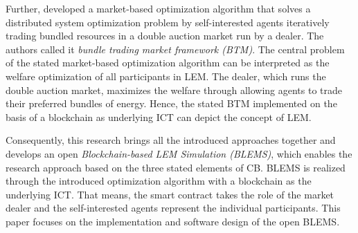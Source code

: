 Further,  developed a market-based optimization algorithm
that solves a distributed system optimization problem by self-interested agents iteratively 
trading bundled resources in a double auction market run by a dealer. The authors called it 
\textit{bundle trading market framework (BTM)}. The central problem of the stated market-based 
optimization algorithm can be interpreted as the welfare optimization of all participants in LEM. 
The dealer, which runs the double auction market, maximizes the welfare through allowing agents 
to trade their preferred bundles of energy. Hence, the stated BTM implemented on the basis of a 
blockchain as underlying ICT can depict the concept of LEM.

Consequently, this research brings all the introduced approaches together 
and develops an open \textit{Blockchain-based LEM Simulation (BLEMS)}, which enables the research 
approach based on the three stated elements of CB. BLEMS is realized through 
the introduced optimization algorithm with a blockchain as the underlying ICT. 
That means, the smart contract takes the role of the market dealer and the self-interested 
agents represent the individual participants. This paper focuses on the 
implementation and software design of the open BLEMS.

\clearpage